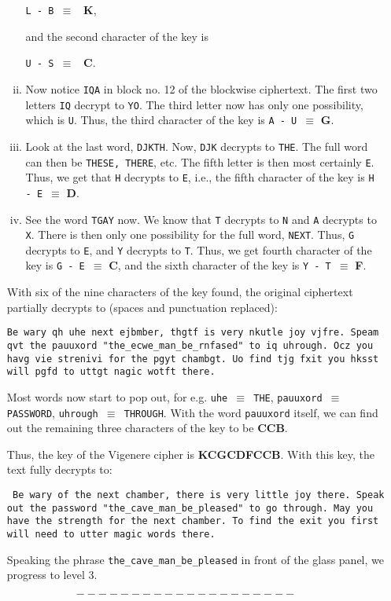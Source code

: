 \documentclass[11pt]{article}
\begin{document}
\begin{enumerate}
\begin{enumerate}[i.]
    \texttt{L - B $\equiv$ } \textbf{K},

    and the second character of the key is 

    \texttt{U - S $\equiv$ } \textbf{C}.
    \bigskip

    \item Now notice \texttt{IQA} in block no. 12 of the blockwise ciphertext. The first two letters \texttt{IQ} decrypt to \texttt{YO}. The third letter now has only one possibility, which is \texttt{U}. Thus, the third character of the key is \texttt{A - U $\equiv$} \textbf{G}.
    
    \item Look at the last word, \texttt{DJKTH}. Now, \texttt{DJK} decrypts to \texttt{THE}. The full word can then be \texttt{THESE, THERE}, etc. The fifth letter is then most certainly \texttt{E}. Thus, we get that \texttt{H} decrypts to \texttt{E}, i.e., the fifth character of the key is \texttt{H - E $\equiv$} \textbf{D}.
    
    \item See the word \texttt{TGAY} now. We know that \texttt{T} decrypts to \texttt{N} and \texttt{A} decrypts to \texttt{X}. There is then only one possibility for the full word, \texttt{NEXT}. Thus, \texttt{G} decrypts to \texttt{E}, and \texttt{Y} decrypts to \texttt{T}. Thus, we get fourth character of the key is \texttt{G - E $\equiv$} \textbf{C}, and the sixth character of the key is \texttt{Y - T $\equiv$} \textbf{F}.

  \end{enumerate}

  With six of the nine characters of the key found, the original ciphertext partially decrypts to (spaces and punctuation replaced):

  \begin{center}
    \texttt{Be wary qh uhe next ejbmber, thgtf is very nkutle joy vjfre. Speam qvt the pauuxord "the\_ecwe\_man\_be\_rnfased" to iq uhrough. Ocz you havg vie strenivi for the pgyt chambgt. Uo find tjg fxit you hksst will pgfd to uttgt nagic wotft there.}
  \end{center}

  Most words now start to pop out, for e.g. \texttt{uhe $\equiv$ THE}, \texttt{pauuxord $\equiv$ PASSWORD}, \texttt{uhrough $\equiv$ THROUGH}. With the word \texttt{pauuxord} itself, we can find out the remaining three characters of the key to be \textbf{CCB}. 
  
  Thus, the key of the Vigenere cipher is \textbf{KCGCDFCCB}. With this key, the text fully decrypts to: 

  \begin{center}
    \texttt{
      Be wary of the next chamber, there is very little joy there. Speak out the password "the\_cave\_man\_be\_pleased" to go through. May you have the strength for the next chamber. To find the exit you first will need to utter magic words there.
    }
  \end{center}
  
   Speaking the phrase \texttt{the\_cave\_man\_be\_pleased} in front of the glass panel, we progress to level 3.
\end{enumerate}

$$--------------------$$
\end{document}
